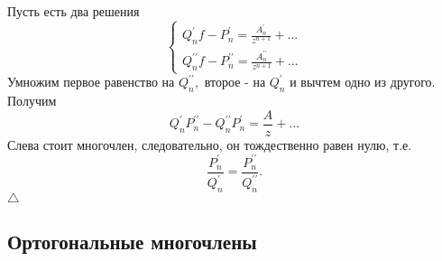 \documentclass[12pt,a4paper]{article}
\theoremstyle{plain}   \newtheorem{Pro}{Задача}
\begin{document}
Пусть есть два решения
\begin{equation*}
  \begin{cases}
    Q_n ^{\prime }f-P_n ^{\prime}=
	\frac{A_n ^{\prime}}{z^{n+1}}+...\\
	Q_n ^{\prime \prime}f-P_n ^{\prime \prime}=
	\frac{A_n ^{\prime \prime}}{z^{n+1}}+...
  \end{cases}
\end{equation*}
Умножим первое равенство на
$ Q_n ^{\prime \prime} ,$
второе - на
$ Q_n ^{\prime} $
и вычтем одно из другого. Получим
$$
  Q_n ^{\prime}P_n ^{\prime \prime}-
  Q_n ^{\prime \prime}P_n ^{\prime}=
  \frac{A}{z}+...
$$
Слева стоит многочлен, следовательно, он тождественно
равен нулю, т.е.
$$
  \frac{P_n ^{\prime}}{Q_n ^{\prime}}=
  \frac{P_n ^{\prime \prime}}
  {Q_n ^{\prime \prime}}.
$$
$ \triangle $
\newpage
\subsection{Ортогональные многочлены}
$ \; $
\\
\end{document}

